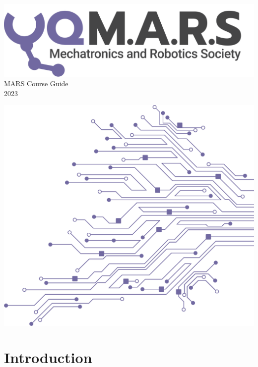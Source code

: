 \documentclass[a4paper,12pt]{report}
\begin{document}
\begin{titlepage}
    \begin{center}
        \vspace*{15mm}
        \includegraphics[width=0.7\paperwidth]{../Assets/Logo (Dark).png} \\
        \vspace{1cm}
        \Huge MARS Course Guide \\
        \huge \textcolor{turbo_purple}{2023}
    \end{center}
    \vfill
    \includegraphics[height=0.5\paperheight, right]{../Assets/Pattern - PCB (Solid).png}
    \vspace*{10mm}
\end{titlepage}
\restoregeometry
\newpage
\tableofcontents
\chapter*{Introduction}
\end{document}
